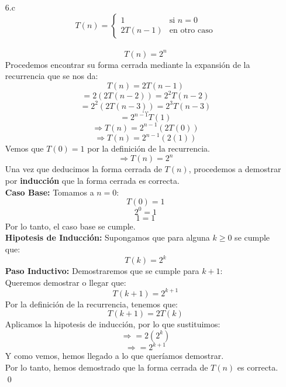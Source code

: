 \documentclass[12pt]{article}
\begin{document}
\begin{itemize}
    \item[6.c]
    \[
        T(n) = \left\{ \begin{array}{ll}
        1 & \text{si } n=0\\ 2T(n-1) & \text{en otro caso} \end{array}\right.
    \]
    \\
    \[
        T(n) = 2^n
    \]
    Procedemos encontrar su forma cerrada mediante la expansión de la recurrencia que se nos da:
    \[
        T(n) = 2T(n-1)
    \]
    \[
        = 2(2T(n-2)) = 2^2T(n-  2)
    \]
    \[
        = 2^2(2T(n-3)) = 2^3T(n-3)
    \]
    \[        ...
    \]
    \[        = 2^{n-1}T(1)
    \]
    \[    \Rightarrow T(n) = 2^{n-1}(2T(0))
    \]
    \[    \Rightarrow T(n) = 2^{n-1}(2(1))
    \]
    Vemos que $T(0) = 1$ por la definición de la recurrencia.\\
    \[    \Rightarrow T(n) = 2^n
    \]
    Una vez que deducimos la forma cerrada de $T(n)$, procedemos a demostrar por \textbf{inducción} que la forma cerrada es correcta.\\
    \textbf{Caso Base:} Tomamos a $n = 0$:
    \[
        T(0) = 1
    \]
    \[        2^0 = 1
    \]
    \[        1 = 1
    \]
    Por lo tanto, el caso base se cumple.\\
    \textbf{Hipotesis de Inducción:} Supongamos que para alguna $k \geq 0$ se cumple que:
    \[        T(k) = 2^k
    \]
    \textbf{Paso Inductivo:} Demostraremos que se cumple para $k + 1$:\\
    Queremos demostrar o llegar que:
    \[        T(k+1) = 2^{k+1}
    \]
    Por la definición de la recurrencia, tenemos que:
    \[        T(k+1) = 2T(k)
    \]
    Aplicamos la hipotesis de inducción, por lo que sustituimos:
    \[    \Rightarrow = 2(2^k)
    \]
    \[        \Rightarrow = 2^{k+1}
    \]
    Y como vemos, hemos llegado a lo que queríamos demostrar.\\
    Por lo tanto, hemos demostrado que la forma cerrada de $T(n)$ es correcta.\\
    \qed


\end{itemize}
\end{document}
